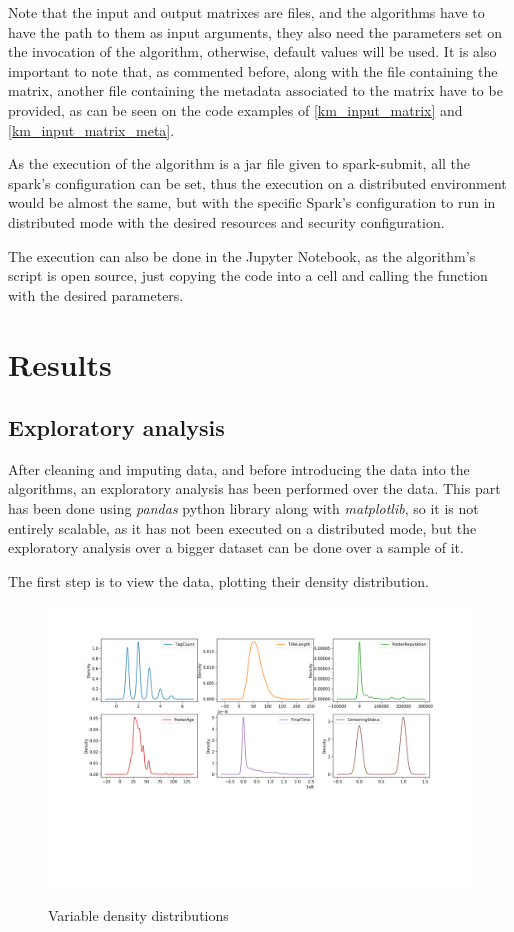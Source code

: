 \documentclass[11pt]{book} %
\begin{document}
    Note that the input and output matrixes are files, and the algorithms have to have the path to them as input arguments, they also need the parameters set on the invocation of the algorithm, otherwise, default values will be used. It is also important to note that, as commented before, along with the file containing the matrix, another file containing the metadata associated to the matrix have to be provided, as can be seen on the code examples of \ref{km_input_matrix} and \ref{km_input_matrix_meta}.

    As the execution of the algorithm is a jar file given to spark-submit, all the spark's configuration can be set, thus the execution on a distributed environment would be almost the same, but with the specific Spark's configuration to run in distributed mode with the desired resources and security configuration.

    The execution can also be done in the Jupyter Notebook, as the algorithm's script is open source, just copying the code into a cell and calling the function with the desired parameters.

  \section{Results}

    \subsection{Exploratory analysis}

      After cleaning and imputing data, and before introducing the data into the algorithms, an exploratory analysis has been performed over the data. This part has been done using \emph{pandas} python library along with \emph{matplotlib}, so it is not entirely scalable, as it has not been executed on a distributed mode, but the exploratory analysis over a bigger dataset can be done over a sample of it.

      The first step is to view the data, plotting their density distribution.

      \begin{figure}[!ht]
        \includegraphics[width=\textwidth]{variables_density_distribution.png}
        \label{img:density}
        \caption{Variable density distributions}
      \end{figure}
\end{document}
